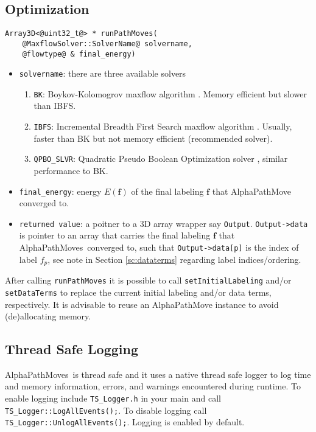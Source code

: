 \documentclass[12pt,letterpaper]{article}
\def\APM{{\ttfamily AlphaPathMoves}~}
\def\labelvars{\mathbf{f}}
\def\labelvar{f}
\begin{document}
\subsection{Optimization}
\begin{lstlisting}
Array3D<@uint32_t@> * runPathMoves(
    @MaxflowSolver::SolverName@ solvername,
    @flowtype@ & final_energy)
\end{lstlisting}
\begin{itemize}
\item \lstinline{solvername}: there are three available solvers
\begin{enumerate}
\item \lstinline{BK}: Boykov-Kolomogrov maxflow algorithm \cite{boykov2004experimental}. Memory efficient but slower than IBFS.
\item \lstinline{IBFS}: Incremental Breadth First Search maxflow algorithm \cite{Goldberg2015}. Usually, faster than BK but not memory efficient (recommended solver).
\item \lstinline{QPBO_SLVR}: Quadratic Pseudo Boolean Optimization solver \cite{rother2007optimizing}, similar performance to BK.
\end{enumerate}
\item \lstinline{final_energy}:  energy $E(\labelvars)$ of the final labeling $\labelvars$ that AlphaPathMove converged to.
\item \lstinline{returned value}: a poitner to a 3D array wrapper say \lstinline{Output}.  \lstinline{Output->data} is pointer to an array that carries the final labeling $\labelvars$ that \APM converged to, such that \lstinline{Output->data[p]} is the index of label $\labelvar_p$, see note in Section \ref{sc:dataterms} regarding label indices/ordering.
\end{itemize}
\begin{tcolorbox}
After calling \lstinline{runPathMoves} it is possible to call \lstinline{setInitialLabeling} and/or \lstinline{setDataTerms} to replace the current initial labeling and/or data terms, respectively. It is advisable to reuse an AlphaPathMove instance to avoid (de)allocating memory.
\end{tcolorbox}

\subsection{Thread Safe Logging}
\APM is thread safe and it uses a native thread safe logger to log time and memory information, errors, and warnings encountered during runtime.
To enable logging include \lstinline{TS_Logger.h} in your main and call \lstinline{TS_Logger::LogAllEvents();}. To disable logging call \lstinline{TS_Logger::UnlogAllEvents();}. Logging is enabled by default.
\end{document}
